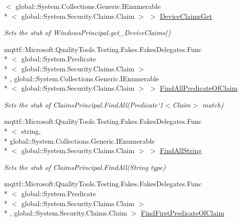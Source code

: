 \begin{DoxyCompactItemize}
$<$ global\-::\-System.\-Collections.\-Generic.\-I\-Enumerable\\*
$<$ global\-::\-System.\-Security.\-Claims.\-Claim $>$ $>$ \hyperlink{class_system_1_1_security_1_1_principal_1_1_fakes_1_1_stub_windows_principal_ab794a7e009fb0ebf290e48db2000ad76}{Device\-Claims\-Get}
\begin{DoxyCompactList}\small\item\em Sets the stub of Windows\-Principal.\-get\-\_\-\-Device\-Claims()\end{DoxyCompactList}\item 
mqttf\-::\-Microsoft.\-Quality\-Tools.\-Testing.\-Fakes.\-Fakes\-Delegates.\-Func\\*
$<$ global\-::\-System.\-Predicate\\*
$<$ global\-::\-System.\-Security.\-Claims.\-Claim $>$\\*
, global\-::\-System.\-Collections.\-Generic.\-I\-Enumerable\\*
$<$ global\-::\-System.\-Security.\-Claims.\-Claim $>$ $>$ \hyperlink{class_system_1_1_security_1_1_principal_1_1_fakes_1_1_stub_windows_principal_a0efdfe17101396d622b97d3b69c0992c}{Find\-All\-Predicate\-Of\-Claim}
\begin{DoxyCompactList}\small\item\em Sets the stub of Claims\-Principal.\-Find\-All(Predicate`1$<$Claim$>$ match)\end{DoxyCompactList}\item 
mqttf\-::\-Microsoft.\-Quality\-Tools.\-Testing.\-Fakes.\-Fakes\-Delegates.\-Func\\*
$<$ string, \\*
global\-::\-System.\-Collections.\-Generic.\-I\-Enumerable\\*
$<$ global\-::\-System.\-Security.\-Claims.\-Claim $>$ $>$ \hyperlink{class_system_1_1_security_1_1_principal_1_1_fakes_1_1_stub_windows_principal_a309fbc5a068eb2b2c1e5427b36faf89c}{Find\-All\-String}
\begin{DoxyCompactList}\small\item\em Sets the stub of Claims\-Principal.\-Find\-All(\-String type)\end{DoxyCompactList}\item 
mqttf\-::\-Microsoft.\-Quality\-Tools.\-Testing.\-Fakes.\-Fakes\-Delegates.\-Func\\*
$<$ global\-::\-System.\-Predicate\\*
$<$ global\-::\-System.\-Security.\-Claims.\-Claim $>$\\*
, global\-::\-System.\-Security.\-Claims.\-Claim $>$ \hyperlink{class_system_1_1_security_1_1_principal_1_1_fakes_1_1_stub_windows_principal_a6a34ac4f818fbdf28b8e5f0244208507}{Find\-First\-Predicate\-Of\-Claim}

\end{DoxyCompactItemize}
